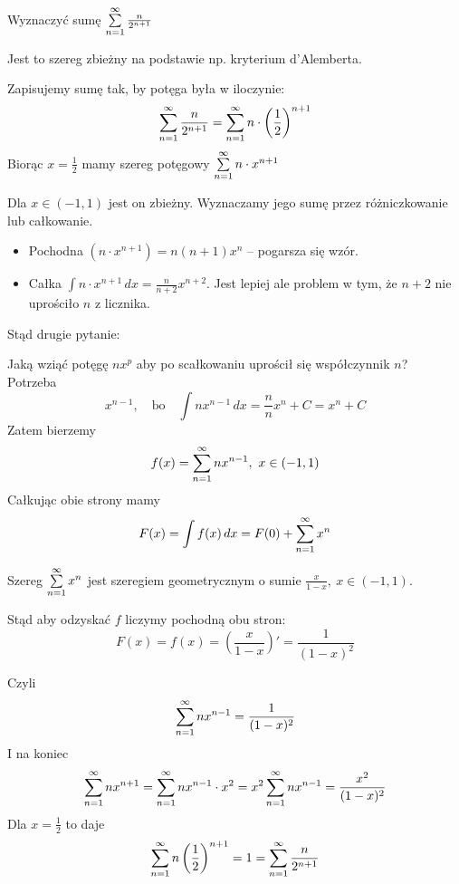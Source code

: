 \begin{adjustbox}{height=0.82\pdfpageheight}

\begin{przyklad}

Wyznaczyć sumę $ \sum\limits_{n = 1}^{\infty} \frac{n}{2^{n + 1}} $

Jest to szereg zbieżny na podstawie np. kryterium d'Alemberta.

Zapisujemy sumę tak, by potęga była w iloczynie:
$$ \sum\limits_{n = 1}^{\infty} \frac{n}{2^{n+1}} = \sum\limits_{n = 1}^{\infty} n \cdot \left( \frac{1}{2} \right)^{n+1} $$
Biorąc $ x = \frac{1}{2} $ mamy szereg potęgowy $ \sum\limits_{n = 1}^{\infty} n \cdot x^{n+1} $

Dla $ x\in (-1, 1) $ jest on zbieżny. Wyznaczamy jego sumę przez różniczkowanie lub całkowanie.

\begin{itemize}
    \item Pochodna $ (n \cdot x^{n+1}) = n(n+1)x^n $ -- pogarsza się wzór.
    \item Całka $ \int n \cdot x^{n+1} \,dx = \frac{n}{n+2}x^{n+2} $. Jest lepiej ale problem w tym, że $n+2$ nie uprościło $n$ z licznika.
\end{itemize}

Stąd drugie pytanie:

Jaką wziąć potęgę $nx^p$ aby po scałkowaniu uprościł się współczynnik $n$? \\

Potrzeba
$$ x^{n-1}, \quad \text{bo} \quad \int nx^{n-1} \,dx = \frac{n}{n} x^n + C = x^n + C $$
Zatem bierzemy
$$ f(x) = \sum\limits_{n = 1}^{\infty} nx^{n-1}, \ x\in (-1, 1) $$
Całkując obie strony mamy
$$ F(x) = \int f(x) \,dx = F(0) + \sum\limits_{n = 1}^{\infty} x^n $$

Szereg $ \sum\limits_{n = 1}^{\infty} x^n $ jest szeregiem geometrycznym o sumie $ \frac{x}{1-x}, \ x\in (-1, 1) $.

Stąd aby odzyskać $f$ liczymy pochodną obu stron:
$$ F(x) = f(x) = \left( \frac{x}{1-x} \right)' = \frac{1}{(1-x)^2} $$

Czyli
$$ \sum\limits_{n = 1}^{\infty} nx^{n-1} = \frac{1}{(1-x)^2} $$
I na koniec
$$ \sum\limits_{n = 1}^{\infty} nx^{n+1} = \sum\limits_{n = 1}^{\infty} nx^{n-1} \cdot x^2 = x^2 \sum\limits_{n = 1}^{\infty} nx^{n-1} = \frac{x^2}{(1-x)^2} $$
Dla $ x = \frac{1}{2} $ to daje
$$ \sum\limits_{n = 1}^{\infty} n \left( \frac{1}{2} \right)^{n+1} = 1 = \sum\limits_{n = 1}^{\infty} \frac{n}{2^{n+1}} $$
\end{przyklad}

\end{adjustbox}